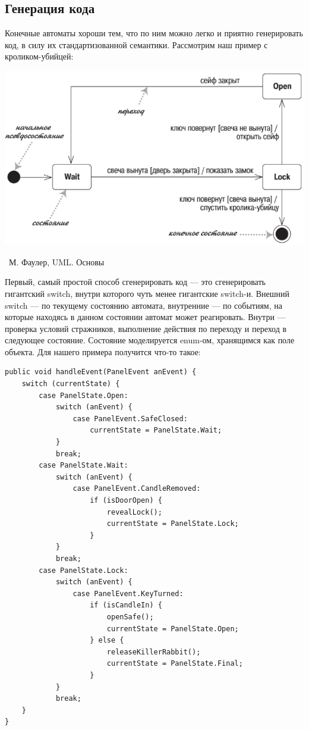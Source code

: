 \documentclass[a5paper]{article}
\newcommand{\attribution}[1] {
	\vspace{-5mm}\begin{flushright}\begin{scriptsize}%
	{\textcopyright\, #1}\end{scriptsize}\end{flushright}
}
\begin{document}
\subsection{Генерация кода}

Конечные автоматы хороши тем, что по ним можно легко и приятно генерировать код, в силу их стандартизованной семантики. Рассмотрим наш пример с кроликом-убийцей:

\begin{center}
	\includegraphics[width=\textwidth]{stateTransitionSyntax.png}
	\attribution{М. Фаулер, UML. Основы}
\end{center}

Первый, самый простой способ сгенерировать код --- это сгенерировать гигантский switch, внутри которого чуть менее гигантские switch-и. Внешний switch --- по текущему состоянию автомата, внутренние --- по событиям, на которые находясь в данном состоянии автомат может реагировать. Внутри --- проверка условий стражников, выполнение действия по переходу и переход в следующее состояние. Состояние моделируется enum-ом, хранящимся как поле объекта. Для нашего примера получится что-то такое:

\begin{verbatim}
public void handleEvent(PanelEvent anEvent) {
    switch (currentState) {
        case PanelState.Open:
            switch (anEvent) {
                case PanelEvent.SafeClosed:
                    currentState = PanelState.Wait;
            }
            break;
        case PanelState.Wait:
            switch (anEvent) {
                case PanelEvent.CandleRemoved:
                    if (isDoorOpen) {
                        revealLock();
                        currentState = PanelState.Lock;
                    }
            }
            break;
        case PanelState.Lock:
            switch (anEvent) {
                case PanelEvent.KeyTurned:
                    if (isCandleIn) {
                        openSafe();
                        currentState = PanelState.Open;
                    } else {
                        releaseKillerRabbit();
                        currentState = PanelState.Final;
                    }
            }
            break;
    }
}
\end{verbatim}
\end{document}
